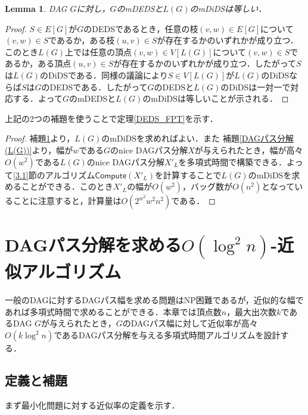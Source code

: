 \documentclass[master]{kuisthesis}		%
\theoremstyle{plain}
\newtheorem{lemma}{Lemma}
\theoremstyle{definition}
\begin{document}
\begin{lemma}\label{mDEDS_mDiDS}
    DAG $G$に対し，$G$のmDEDSと$L(G)$のmDiDSは等しい．
\end{lemma}

\begin{proof}
    $S\in E[G]$が$G$のDEDSであるとき，任意の枝$(v, w) \in E[G]$について$(v, w)\in S$であるか，ある枝$(u, v)\in S$が存在するかのいずれかが成り立つ．このとき$L(G)$上では任意の頂点$(v, w) \in V[L(G)]$について$(v, w)\in S$であるか，ある頂点$(u, v)\in S$が存在するかのいずれかが成り立つ．したがって$S$は$L(G)$のDiDSである．同様の議論により$S\in V[L(G)]$が$L(G)$のDiDSならば$S$は$G$のDEDSである．したがって$G$のDEDSと$L(G)$のDiDSは一対一で対応する．よって$G$のmDEDSと$L(G)$のmDiDSは等しいことが示される．
\end{proof}

上記の2つの補題を使うことで定理\ref{DEDS_FPT}を示す．

\begin{proof}
    補題\ref{mDEDS_mDiDS}より，$L(G)$のmDiDSを求めればよい．また 補題\ref{DAGパス分解(L(G))}より，幅が$w$である$G$のnice DAGパス分解$X$が与えられたとき，幅が高々$O(w^2)$である$L(G)$のnice DAGパス分解$X'_L$を多項式時間で構築できる．よって\ref{3.1}節のアルゴリズム$\mathsf{Compute}(X'_L)$を計算することで$L(G)$のmDiDSを求めることができる．このとき$X'_L$の幅が$O(w^2)$，バッグ数が$O(n^2)$となっていることに注意すると，計算量は$O(2^{w^2}w^2n^2)$である．
\end{proof}



















\section{DAGパス分解を求める$O(\log ^2 n)$-近似アルゴリズム} %
一般のDAGに対するDAGパス幅を求める問題はNP困難であるが，近似的な幅であれば多項式時間で求めることができる．本章では頂点数$n$，最大出次数$k$であるDAG $G$が与えられたとき，$G$のDAGパス幅に対して近似率が高々$O(k\log ^2 n)$であるDAGパス分解を与える多項式時間アルゴリズムを設計する．

\subsection{定義と補題}
まず最小化問題に対する近似率の定義を示す．
\end{document}
